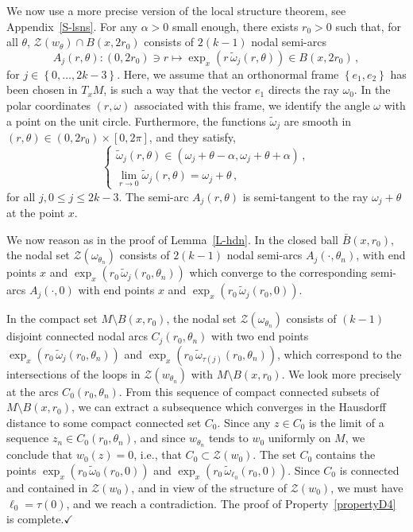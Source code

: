 \documentclass[12pt,a4paper]{amsart}
\theoremstyle{plain} %
\theoremstyle{definition}
\numberwithin{equation}{section}
\numberwithin{figure}{section}
\numberwithin{table}{section}
\newcommand{\cZ}{\mathcal{Z}}
\newcommand{\qedc}{$\checkmark$}
\newcommand{\sm}{\!\setminus\!}
\newcommand{\set}[1]{\left\lbrace #1 \right\rbrace}
\newcommand{\omegat}{\widetilde{\omega}}
\begin{document}
We now use a more precise version of the local structure theorem, see Appendix~\ref{S-lsns}. For any $\alpha > 0$ small enough, there exists $r_0 > 0$ such that, for all $\theta$, $ \cZ(w_{\theta}) \cap B(x,2r_0)$ consists of $2(k-1)$ nodal semi-arcs
%
\begin{equation}\label{E-h2n-8a}
A_j(r,\theta) : (0,2r_0) \ni r \mapsto \exp_x\left(r\, \omegat_j(r,\theta) \right) \in B(x,2r_0)\,,
\end{equation}
%
for $j \in \set{0,\ldots,2k-3}$. Here, we assume that an orthonormal frame $\set{e_1,e_2}$ has been chosen in $T_xM$, is such a way that the vector $e_1$ directs the ray $\omega_0$. In the polar coordinates $(r,\omega)$ associated with this frame, we identify the angle $\omega$ with a point on the unit circle. Furthermore, the functions $\omegat_j$ are smooth in $(r,\theta) \in (0,2r_0) \times [0,2\pi]$, and they satisfy,
%
\begin{equation}\label{E-h2n-8b}
\left\{
\begin{array}{l}
\omegat_j(r,\theta) \in \left( \omega_j+\theta - \alpha , \omega_j + \theta +\alpha \right)\,,\\[5pt]
\lim_{r \to 0} \omegat_j(r,\theta) = \omega_j + \theta\,,
\end{array}
\right.
\end{equation}
%
for all $j, 0 \le j \le 2k-3$. The semi-arc $A_j(r,\theta)$ is semi-tangent to the ray $\omega_j+\theta$ at the point $x$.\smallskip

We now reason as in the proof of Lemma~\ref{L-hdn}. In the closed ball $\bar{B}(x,r_0)$, the nodal set $\cZ(\omega_{\theta_n})$ consists of $2(k-1)$ nodal semi-arcs $A_j(\cdot,\theta_n)$, with end points $x$ and $\exp_x(r_0\, \omegat_j(r_0,\theta_n))$ which converge to the corresponding semi-arcs $A_j(\cdot,0)$ with end points $x$ and $\exp_x(r_0\, \omegat_j(r_0,0))$.\smallskip

In the compact set $M\sm B(x,r_0)$, the nodal set $\cZ(\omega_{\theta_n})$ consists of $(k-1)$ disjoint connected nodal arcs $C_j(r_0,\theta_n)$ with two end points $\exp_x(r_0\, \omegat_j(r_0,\theta_n))$ and $\exp_x(r_0\, \omegat_{\tau(j)}(r_0,\theta_n))$, which correspond to the intersections of the loops in $\cZ(w_{\theta_n})$ with $M\sm B(x,r_0)$. We look more precisely at the arcs $C_0(r_0,\theta_n)$. From this sequence of compact connected subsets of $M\sm B(x,r_0)$, we can extract a subsequence which converges in the Hausdorff distance to some compact connected set $C_0$. Since any $z \in C_0$ is the limit of a sequence $z_n \in C_0(r_0,\theta_n)$, and since $w_{\theta_n}$ tends to $w_0$ uniformly on $M$, we conclude that $w_0(z) = 0$, i.e., that $C_0 \subset \cZ(w_0)$. The set $C_0$ contains the points $\exp_x(r_0\, \omegat_0(r_0,0))$ and $\exp_x(r_0\, \omegat_{\ell_0}(r_0,0))$. Since $C_0$ is connected and contained in $\cZ(w_0)$, and in view of the structure of $\cZ(w_0)$, we must have $\ell_0 = \tau(0)$, and we reach a contradiction. The proof of Property~\ref{propertyD4} is complete.\hfill \qedc \bigskip
\end{document}

